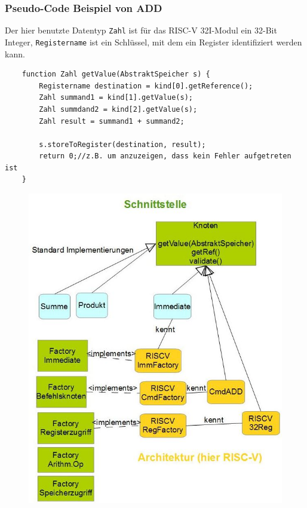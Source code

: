 \subsubsection{Pseudo-Code Beispiel von ADD}
Der hier benutzte Datentyp \texttt{Zahl} ist für das RISC-V 32I-Modul ein 32-Bit Integer, \texttt{Registername} ist ein Schlüssel, mit dem ein Register identifiziert werden kann.
\begin{lstlisting}
	function Zahl getValue(AbstraktSpeicher s) {
		Registername destination = kind[0].getReference();
		Zahl summand1 = kind[1].getValue(s);
		Zahl summdand2 = kind[2].getValue(s);
		Zahl result = summand1 + summand2;

		s.storeToRegister(destination, result);
		return 0;//z.B. um anzuzeigen, dass kein Fehler aufgetreten ist
	}
\end{lstlisting}
\begin{figure}[h!]
\centering
\includegraphics[scale=0.5]{../arch/figures/zeichnung}
\end{figure}


